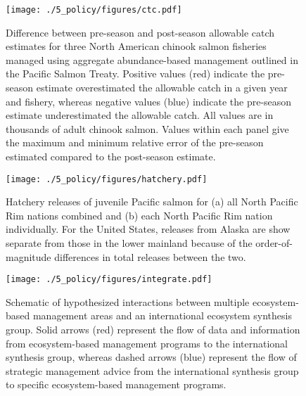 \begin{figure}[htbp]
  \centering \texttt{[image: ./5\_policy/figures/ctc.pdf]}
  \caption[Difference between pre-season and post-season allowable catch
           estimates for three North American chinook salmon
           fisheries.]{Difference between pre-season and post-season allowable
           catch estimates for three North American chinook salmon fisheries
           managed using aggregate abundance-based management outlined in the
           Pacific Salmon Treaty. Positive values (red) indicate the pre-season
           estimate overestimated the allowable catch in a given year and
           fishery, whereas negative values (blue) indicate the pre-season
           estimate underestimated the allowable catch. All values are in
           thousands of adult chinook salmon. Values within each panel give the
           maximum and minimum relative error of the pre-season estimated
           compared to the post-season estimate.}
  \label{fig:ebm:2}
\end{figure}


\begin{figure}[htbp]
  \centering \texttt{[image: ./5\_policy/figures/hatchery.pdf]}
  \caption[Hatchery releases of juvenile Pacific salmon from North Pacific Rim
           nations.]{Hatchery releases of juvenile Pacific salmon for (a) all
           North Pacific Rim nations combined and (b) each North Pacific Rim
           nation individually. For the United States, releases from Alaska are
           show separate from those in the lower mainland because of the
           order-of-magnitude differences in total releases between the two.}
  \label{fig:ebm:3}
\end{figure}


\begin{figure}[htbp]
  \centering \texttt{[image: ./5\_policy/figures/integrate.pdf]}
  \caption[Schematic of hypothesized interactions between multiple
           ecosystem-based management areas and an international ecosystem
           synthesis group.]{Schematic of hypothesized interactions between
           multiple ecosystem-based management areas and an international
           ecosystem synthesis group. Solid arrows (red) represent the flow of
           data and information from ecosystem-based management programs to the
           international synthesis group, whereas dashed arrows (blue) represent
           the flow of strategic management advice from the international
           synthesis group to specific ecosystem-based management programs.}
  \label{fig:ebm:4}
\end{figure}
